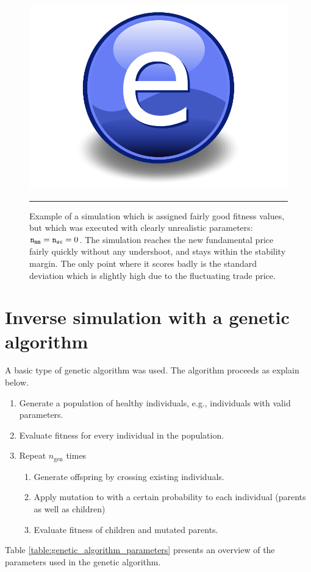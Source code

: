 \begin{figure}[htbp]
	\centering
		\includegraphics{Figures/Electron.pdf}
		\rule{35em}{0.5pt}
	\caption{Example of a simulation which is assigned fairly good fitness values, but which was executed with clearly unrealistic parameters: $ \texttt{n}_\texttt{mm}  =  \texttt{n}_\texttt{sc}  = 0$. The simulation reaches the new fundamental price fairly quickly without any undershoot, and stays within the stability margin. The only point where it scores badly is the standard deviation which is slightly high due to the fluctuating trade price.}
	\label{fig:no_marketmakers}
\end{figure}



\section{Inverse simulation with a genetic algorithm}\label{section:genetic_algorithm}
A basic type of genetic algorithm was used. The algorithm proceeds as explain below.
\begin{enumerate}
	\item Generate a population of healthy individuals, e.g., individuals with valid parameters.
	\item Evaluate fitness for every individual in the population.
	\item Repeat $n_\text{gen}$ times 
	\begin{enumerate}
		\item Generate offspring by crossing existing individuals.
		\item Apply mutation to with a certain probability to each individual (parents as well as children)
		\item Evaluate fitness of children and mutated parents.
	\end{enumerate}
\end{enumerate}
Table \ref{table:genetic_algorithm_parameters} presents an overview of the parameters used in the genetic algorithm. 

